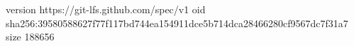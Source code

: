 version https://git-lfs.github.com/spec/v1
oid sha256:39580588627f77f117bd744ea154911dce5b714dca28466280cf9567dc7f31a7
size 188656
